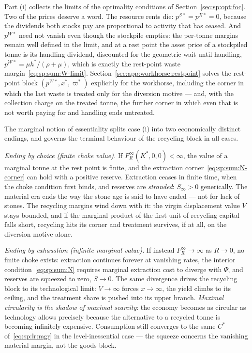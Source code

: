 Part (i) collects the limits of the optimality conditions of Section~\ref{sec:sp:opt:foc}. Two of the prices deserve a word. The resource rents die: $p^{S*}=p^{X*}=0$, because the dividends both stocks pay are proportional to activity that has ceased. And $p^{W*}$ need not vanish even though the stockpile empties: the per-tonne margins remain well defined in the limit, and at a rest point the asset price of a stockpiled tonne is its handling dividend, discounted for the geometric wait until handling, $p^{\mathcal W*}=\mu h^*/\left(\rho+\mu\right)$, which is exactly the rest-point waste margin~\eqref{eq:sp:sum:W-limit}. Section~\ref{sec:app:workhorse:restpoint} solves the rest-point block $\left(p^{W*},x^*,\varpi^*\right)$ explicitly for the workhorse, including the corner in which the last waste is treated only for the diversion motive --- and, with the collection charge on the treated tonne, the further corner in which even that is not worth paying for and handling ends untreated.

 The marginal notion of essentiality splits case (i) into two economically distinct endings, and governs the terminal behaviour of the recycling block in all cases.

\emph{Ending by choice (finite choke value).} If $F^\infty_R\left(K^*,0,0\right)<\infty$, the value of a marginal tonne at the rest point is finite, and the extraction corner~\eqref{eq:sp:sum:N-corner} can hold with a positive reserve. Extraction ceases in finite time, when the choke condition first binds, and reserves are \emph{stranded}: $S_\infty>0$ generically. The material era ends the way the stone age is said to have ended --- not for lack of stones. The recycling margins wind down with it: the virgin displacement value $V$ stays bounded, and if the marginal product of the first unit of recycling capital falls short, recycling hits its corner and treatment survives, if at all, on the diversion motive alone.

\emph{Ending by exhaustion (infinite marginal value).} If instead $F^\infty_R\to\infty$ as $R\to0$, no finite choke exists: extraction continues forever at vanishing rates, the interior condition~\eqref{eq:sp:sum:N} requires marginal extraction cost to diverge with $\Psi$, and reserves are squeezed to zero, $S\to0$. The same divergence drives the recycling block to its technological limit: $V\to\infty$ forces $x\to\infty$, the yield climbs to its ceiling, and the treatment share is pushed into its upper branch. \emph{Maximal circularity is the shadow of maximal scarcity}: the economy becomes as circular as technology allows precisely because the alternative to a recycled tonne is becoming infinitely expensive. Consumption still converges to the same $C^*$ of~\eqref{eq:sp:lr:mgr} in the level-inessential case --- the squeeze concerns the vanishing material margin, not the goods block.

